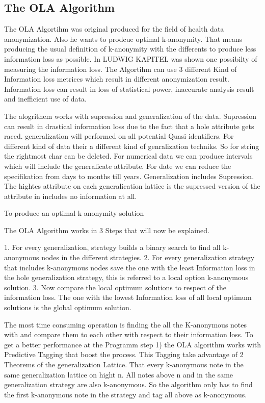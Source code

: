 \documentclass{llncs}
\begin{document}
\subsection{The OLA Algorithm }

The OLA Algortihm was original produced for the field of health data anonymization. Also he wants to prodcue optimal k-anonymity. That means producing the usual definition of k-anonymity with the differents to produce less information loss as possible. In LUDWIG KAPITEL was shown one possibilty of measuring the information loss. The Algortihm can use 3 different Kind of Information loss metrices which result in different anonymization result. Information loss can result in loss of statistical power, inaccurate analysis result and inefficient use of data. 

 The alogrithem works with supression and generalization of the data. Supression can result in drastical information loss due to the fact that a hole attribute gets raced.  generalization will performed on all potential Quasi identifiers. For different kind of data their a different kind of genralization techniks. So for string the rightmost char can be deleted. For numerical data we can produce intervals which will include the generalicate attribute. For date we can reduce the specifikation from days to months till years. Generalization includes Supression. The hightes attribute on each generalication lattice is the supressed version of the attribute in includes no information at all. 




To produce an optimal k-anonymity solution 


The OLA Algorithm works in 3 Steps that will now be explained.

1.    For every generalization, strategy builds a binary search to find all k-anonymous nodes in the different strategies.
2.    For every generalization strategy that includes k-anonymous nodes save the one with the least Information loss in the hole generalization strategy, this is referred to a local option k-anonymous solution.
3.    Now compare the local optimum solutions to respect of the information loss. The one with the lowest Information loss of all local optimum solutions is the global optimum solution.

The most time consuming operation is finding the all the K-anonymous notes with and compare them to each other with respect to their information loss.  To get a better performance at the Programm step 1) the OLA algorithm works with Predictive Tagging that boost the process.  This Tagging take advantage of 2 Theorems of the generalization Lattice. That every k-anonymous note in the same generalization lattice on hight n. All notes above n and in the same generalization strategy are also k-anonymous. So the algorithm only has to find the first k-anonymous note in the strategy and tag all above as k-anonymous.   
\end{document}
